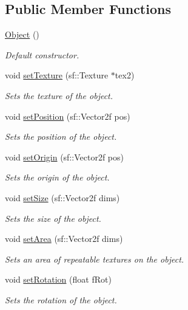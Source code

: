 \subsection*{Public Member Functions}
\begin{DoxyCompactItemize}
\item 
\hyperlink{class_object_a40860402e64d8008fb42329df7097cdb}{Object} ()
\begin{DoxyCompactList}\small\item\em Default constructor. \end{DoxyCompactList}\item 
void \hyperlink{class_object_afc2a48e052cf81a72500eb24ace88bb1}{set\+Texture} (sf\+::\+Texture $\ast$tex2)
\begin{DoxyCompactList}\small\item\em Sets the texture of the object. \end{DoxyCompactList}\item 
void \hyperlink{class_object_ae3f485491191476e1c89c37a29d0e01f}{set\+Position} (sf\+::\+Vector2f pos)
\begin{DoxyCompactList}\small\item\em Sets the position of the object. \end{DoxyCompactList}\item 
void \hyperlink{class_object_adb4b797ded7041cade7af9bae71c341b}{set\+Origin} (sf\+::\+Vector2f pos)
\begin{DoxyCompactList}\small\item\em Sets the origin of the object. \end{DoxyCompactList}\item 
void \hyperlink{class_object_a07e8d31921144019dab0ae66d3530d83}{set\+Size} (sf\+::\+Vector2f dims)
\begin{DoxyCompactList}\small\item\em Sets the size of the object. \end{DoxyCompactList}\item 
void \hyperlink{class_object_a4e0b54d91d7cc6b0935dd64101363190}{set\+Area} (sf\+::\+Vector2f dims)
\begin{DoxyCompactList}\small\item\em Sets an area of repeatable textures on the object. \end{DoxyCompactList}\item 
void \hyperlink{class_object_a5e1b5e2598ab219cc45b960c5d96c656}{set\+Rotation} (float f\+Rot)
\begin{DoxyCompactList}\small\item\em Sets the rotation of the object. \end{DoxyCompactList}\item 

\end{DoxyCompactItemize}

